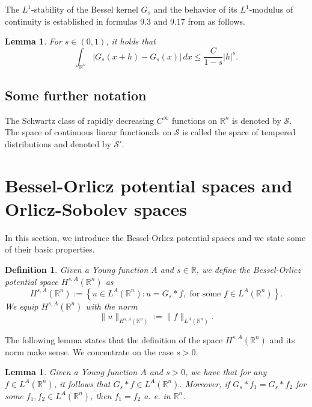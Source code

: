 \documentclass[leqno,twoside, 12pt]{amsart}
\theoremstyle{plain}
\numberwithin{equation}{section} \numberwithin{figure}{section}
\newtheorem{lemma}[theorem]{Lemma}
\newtheorem{definition}[theorem]{Definition}
\theoremstyle{definition}
\newcommand{\R}{\mathbb R}
\numberwithin{equation}{section}
\begin{document}
The $L^1$-stability of the Bessel kernel $G_s$ and the behavior of its $L^1$-modulus of continuity is established in formulas 9.3 and 9.17 from \cite{AS} as follows.
\begin{lemma} \label{lema.2}
For $s\in(0,1)$, it holds that
$$
\int_{\R^n} |G_s(x+h)-G_s(x)|\,dx \leq \frac{C}{1-s} |h|^s.
$$
\end{lemma}

\subsection{Some further notation} The Schwartz class of rapidly decreasing $C^\infty$ functions on $\R^n$ is denoted by $\mathcal{S}$. The space of continuous linear functionals on $\mathcal{S}$ is called the space of tempered distributions and denoted by $\mathcal{S}'$. 
 


\section{Bessel-Orlicz potential spaces and Orlicz-Sobolev spaces} \label{sec.bessel}

In this section, we introduce the Bessel-Orlicz potential spaces and we state some of their basic properties.



\begin{definition}Given a Young function $A$ and $s \in \R$, we define the Bessel-Orlicz potential space $H^{s, A}(\mathbb{R}^n)$ as
$$H^{s, A}(\mathbb{R}^n):=\left\lbrace u\in L^A(\mathbb{R}^n): u= G_s*f, \text{ for some }f\in L^A(\mathbb{R}^n)\right\rbrace.$$We equip $H^{s, A}(\mathbb{R}^n)$ with the norm
$$\|u\|_{H^{s, A}(\mathbb{R}^n)}:=\|f\|_{L^A(\mathbb{R}^n)}.$$
\end{definition}

The following lemma states that the definition of the space $H^{s, A}(\mathbb{R}^n)$ and its norm make sense. We concentrate on the case $s>0$.
\begin{lemma}Given a Young function $A$ and $s>0$, we have that for any $f\in L^A(\mathbb{R}^n)$, it follows that $G_s*f\in L^A(\mathbb{R}^n)$. Moreover, if $G_s*f_1=G_s*f_2$ for some $f_1, f_2\in L^A(\mathbb{R}^n)$, then $f_1=f_2$ a. e. in $\mathbb{R}^n$.
\end{lemma}
\end{document}
